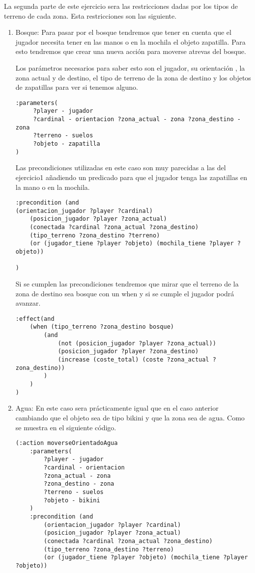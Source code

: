 \documentclass[]{article}
\begin{document}
La segunda parte de este ejercicio sera las restricciones dadas por los tipos de terreno de cada zona. Esta restricciones son las siguiente.

\begin{enumerate}
	\item {Bosque: } Para pasar por el bosque tendremos que tener en cuenta que el jugador necesita tener en las manos o en la mochila el objeto zapatilla. Para esto tendremos que crear una nueva acción para moverse atrevas del bosque.
	
	Los parámetros necesarios para saber esto son el jugador, su orientación , la zona actual y de destino, el tipo de terreno de la zona de destino y los objetos de zapatillas para ver si tenemos alguno.
	
	\begin{lstlisting}
:parameters(
	 ?player - jugador
	 ?cardinal - orientacion ?zona_actual - zona ?zona_destino - zona  
	 ?terreno - suelos 
	 ?objeto - zapatilla
)

	\end{lstlisting}
Las precondiciones utilizadas en este caso son muy parecidas a las del ejercicio1 añadiendo un predicado para que el jugador tenga las zapatillas en la mano o en la mochila.
	\begin{lstlisting}
:precondition (and 
(orientacion_jugador ?player ?cardinal)
	(posicion_jugador ?player ?zona_actual)
	(conectada ?cardinal ?zona_actual ?zona_destino)
	(tipo_terreno ?zona_destino ?terreno)
	(or (jugador_tiene ?player ?objeto) (mochila_tiene ?player ?objeto))

)
	\end{lstlisting}
	Si se cumplen las precondiciones tendremos que mirar que el terreno de la zona de destino sea bosque con un when y si se cumple el jugador podrá avanzar.
	\begin{lstlisting}
:effect(and 
	(when (tipo_terreno ?zona_destino bosque) 
		(and 
			(not (posicion_jugador ?player ?zona_actual))
			(posicion_jugador ?player ?zona_destino)
			(increase (coste_total) (coste ?zona_actual ?zona_destino))
		)
	)
)	
	\end{lstlisting}
\newpage	
\item{Agua:} En este caso sera prácticamente igual que en el caso anterior cambiando que el objeto sea de tipo bikini y que la zona sea de agua. Como se muestra en el siguiente código.

\begin{lstlisting}
(:action moverseOrientadoAgua
	:parameters(
		?player - jugador 
		?cardinal - orientacion 
		?zona_actual - zona 
		?zona_destino - zona  
		?terreno - suelos 
		?objeto - bikini
	)
	:precondition (and 
		(orientacion_jugador ?player ?cardinal)
		(posicion_jugador ?player ?zona_actual)
		(conectada ?cardinal ?zona_actual ?zona_destino)
		(tipo_terreno ?zona_destino ?terreno)
		(or (jugador_tiene ?player ?objeto) (mochila_tiene ?player ?objeto))
		

\end{lstlisting}
\end{enumerate}
\end{document}
